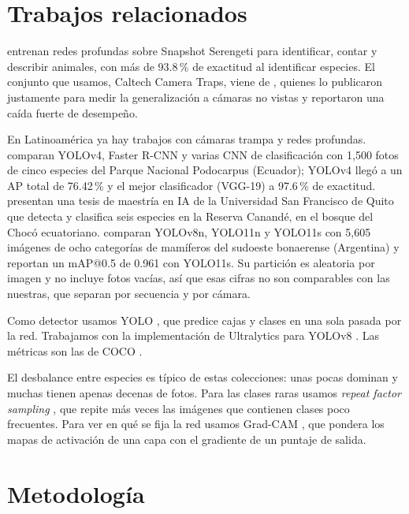 \documentclass[10pt,letterpaper]{article}
\begin{document}
\section{Trabajos relacionados}
\citet{norouzzadeh2018} entrenan redes profundas sobre Snapshot Serengeti para identificar, contar y describir animales, con más de 93.8\,\% de exactitud al identificar especies. El conjunto que usamos, Caltech Camera Traps, viene de
\citet{beery2018terra}, quienes lo publicaron justamente para medir la generalización a cámaras no vistas y reportaron una caída fuerte de desempeño.

En Latinoamérica ya hay trabajos con cámaras trampa y redes profundas. \citet{suing2023} comparan YOLOv4, Faster R-CNN y varias CNN de clasificación con 1,500 fotos de cinco especies del Parque Nacional Podocarpus (Ecuador); YOLOv4 llegó a un AP total de 76.42\,\% y el mejor clasificador (VGG-19) a 97.6\,\% de exactitud. \citet{montenegro2024choco} presentan una tesis de maestría en IA de la Universidad San Francisco de Quito que detecta y clasifica seis especies en la Reserva Canandé, en el bosque del Chocó ecuatoriano. \citet{marticorena2025} comparan YOLOv8n, YOLO11n y YOLO11s con 5,605 imágenes de ocho categorías de mamíferos del sudoeste bonaerense (Argentina) y reportan un mAP@0.5 de 0.961 con YOLO11s. Su partición es aleatoria por imagen y no incluye fotos vacías, así que esas cifras no son comparables con las nuestras, que separan por secuencia y por cámara.

Como detector usamos YOLO \citep{redmon2016yolo}, que predice cajas y clases en una sola pasada por la red. Trabajamos con la implementación de Ultralytics para
YOLOv8 \citep{jocher2023ultralytics}. Las métricas son las de COCO \citep{lin2014coco}.

El desbalance entre especies es típico de estas colecciones: unas pocas dominan y muchas tienen apenas decenas de fotos. Para las clases raras usamos
\emph{repeat factor sampling} \citep{gupta2019lvis}, que repite más veces las imágenes que contienen clases poco frecuentes. Para ver en qué se fija la red usamos
Grad-CAM \citep{selvaraju2017gradcam}, que pondera los mapas de activación de una capa con el gradiente de un puntaje de salida.

\section{Metodología}
\end{document}
